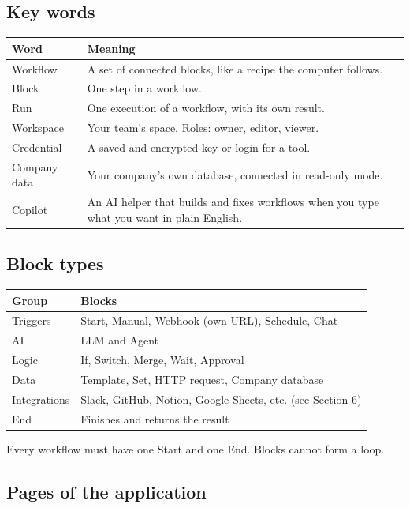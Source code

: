 \documentclass[11pt,a4paper]{article}
\begin{document}
\subsection{Key words}

\begin{longtable}{@{}L{3.4cm}L{12cm}@{}}
\toprule
\textbf{Word} & \textbf{Meaning} \\
\midrule
\endhead
Workflow & A set of connected blocks, like a recipe the computer follows. \\
Block & One step in a workflow. \\
Run & One execution of a workflow, with its own result. \\
Workspace & Your team's space. Roles: owner, editor, viewer. \\
Credential & A saved and encrypted key or login for a tool. \\
Company data & Your company's own database, connected in read-only mode. \\
Copilot & An AI helper that builds and fixes workflows when you type what you want in plain English. \\
\bottomrule
\end{longtable}

\subsection{Block types}

\begin{longtable}{@{}L{3.2cm}L{12.4cm}@{}}
\toprule
\textbf{Group} & \textbf{Blocks} \\
\midrule
\endhead
Triggers & Start, Manual, Webhook (own URL), Schedule, Chat \\
AI & LLM and Agent \\
Logic & If, Switch, Merge, Wait, Approval \\
Data & Template, Set, HTTP request, Company database \\
Integrations & Slack, GitHub, Notion, Google Sheets, etc. (see Section 6) \\
End & Finishes and returns the result \\
\bottomrule
\end{longtable}

Every workflow must have one Start and one End. Blocks cannot form a loop.

\subsection{Pages of the application}
\end{document}
